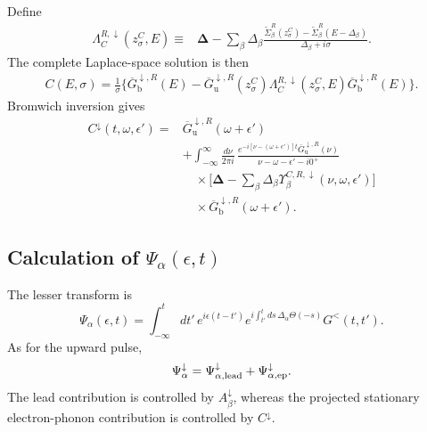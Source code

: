 \documentclass[
 reprint,
 superscriptaddress,
 amsmath,amssymb,
 aps,prb,
 longbibliography,
 floatfix
]{revtex4-2}
\newcommand{\ep}{\mathrm{ep}}
\begin{document}
Define
\begin{equation*}
\begin{aligned}
\Lambda_C^{R,\downarrow}
(z_\sigma^C,E)
\equiv{}&
\bm\Delta
-
\sum_\beta
\Delta_\beta
\frac{
\widetilde\Sigma_\beta^R(z_\sigma^C)
-
\widetilde\Sigma_\beta^R(E-\Delta_\beta)}
{\Delta_\beta+i\sigma}.
\end{aligned}
\end{equation*}
The complete Laplace-space solution is then
\begin{equation*}
\begin{aligned}
C(E,\sigma)
=
\frac{1}{\sigma}
\Bigg\{
\overline G_{\mathrm b}^{\downarrow,R}(E)
-
\overline G_{\mathrm u}^{\downarrow,R}
(z_\sigma^C)
\Lambda_C^{R,\downarrow}
(z_\sigma^C,E)
\overline G_{\mathrm b}^{\downarrow,R}(E)
\Bigg\}.
\end{aligned}
\end{equation*}
Bromwich inversion gives
\begin{equation}
\boxed{
\begin{aligned}
C^\downarrow(t,\omega,\epsilon')
={}&
\overline G_{\mathrm u}^{\downarrow,R}
(\omega+\epsilon')
\\
&+
\int_{-\infty}^{\infty}
\frac{d\nu}{2\pi i}\,
\frac{
e^{-i[\nu-(\omega+\epsilon')]t}
\overline G_{\mathrm u}^{\downarrow,R}
(\nu)}
{\nu-\omega-\epsilon'-i0^+}
\\
&\quad\times
\Bigg[
\bm\Delta
-
\sum_\beta
\Delta_\beta
\Upsilon_\beta^{C,R,\downarrow}
(\nu,\omega,\epsilon')
\Bigg]
\\
&\quad\times
\overline G_{\mathrm b}^{\downarrow,R}
(\omega+\epsilon').
\end{aligned}}
\label{eq:C-down-final}
\end{equation}

\subsection{Calculation of $\Psi_\alpha(\epsilon,t)$}
\label{sec:down-Psi}

The lesser transform is
\begin{equation*}
\Psi_\alpha(\epsilon,t)
=
\int_{-\infty}^{t}dt'\,
e^{i\epsilon(t-t')}
e^{i\int_{t'}^t ds\,
\Delta_\alpha\Theta(-s)}
G^<(t,t').
\end{equation*}
As for the upward pulse,
\begin{equation}
\Psi_\alpha^\downarrow
=
\Psi_{\alpha,\rm lead}^\downarrow
+
\Psi_{\alpha,\ep}^\downarrow.
\label{eq:Psi-down-split}
\end{equation}
The lead contribution is controlled by $A_\beta^\downarrow$, whereas the projected stationary electron-phonon contribution is controlled by
$C^\downarrow$.
\end{document}
